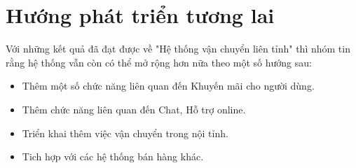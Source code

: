 	
	
	\section{Hướng phát triển tương lai}
	Với những kết quả đã đạt được về "Hệ thống vận chuyển liên tỉnh" thì nhóm tin rằng hệ thống vẫn còn có thể mở rộng hơn nữa theo một số hướng sau:
	
	\begin{itemize}
		\item Thêm một số chức năng liên quan đến Khuyến mãi cho người dùng.
		\item Thêm chức năng liên quan đến Chat, Hỗ trợ online.
		\item Triển khai thêm việc vận chuyển trong nội tỉnh.
		\item Tich hợp với các hệ thống bán hàng khác. 
	\end{itemize}